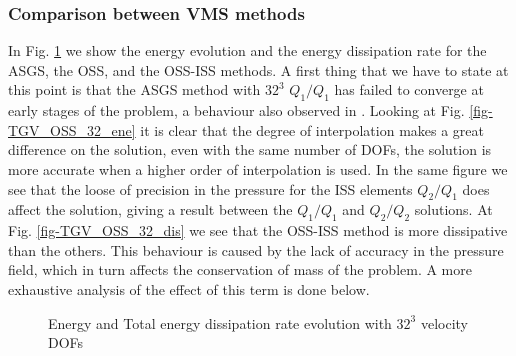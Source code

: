 \subsubsection{Comparison between VMS methods}
In Fig. \ref{fig-TGV_OSS_32_ene_dis} we show the energy evolution and the energy dissipation rate for the ASGS, the OSS, and the OSS-ISS methods. A first thing that we have to state at this point is that the ASGS method with $32^3$ $Q_1/Q_1$ has failed to converge at early stages of the problem, a behaviour also observed in \cite{colomes_assessment_2015}. Looking at Fig. \ref{fig-TGV_OSS_32_ene} it is clear that the degree of interpolation makes a great difference on the solution, even with the same number of DOFs, the solution is more accurate when a higher order of interpolation is used. In the same figure we see that the loose of precision in the pressure for the ISS elements $Q_2/Q_1$ does affect the solution, giving a result between the $Q_1/Q_1$ and $Q_2/Q_2$ solutions. At Fig. \ref{fig-TGV_OSS_32_dis} we see that the OSS-ISS method is more dissipative than the others. This behaviour is caused by the lack of accuracy in the pressure field, which in turn affects the conservation of mass of the problem. A more exhaustive analysis of the effect of this term is done below.
\begin{figure}[h!]
  \centering
  \caption{Energy and Total energy dissipation rate evolution with $32^3$ velocity DOFs}
  \label{fig-TGV_OSS_32_ene_dis}
\end{figure}

